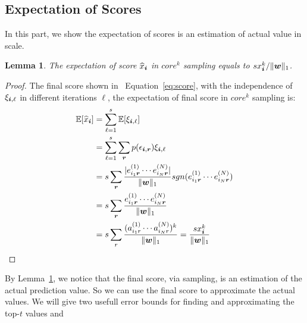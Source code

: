 \documentclass[letterpaper]{article}
\newcommand{\Sca}[3]{{#1}^{(#2)}_{i_#2#3}}%
\newcommand{\anr}[2]{\Sca{a}{#1}{#2}}
\newcommand{\enr}[2]{\Sca{e}{#1}{\V{#2}}}
\newcommand{\score}[1]{\xi_{\V{i},#1}}
\newcommand{\V}[1]{{\bm{{\MakeLowercase{#1}}}}}
\newcommand{\norm}[2]{\|#1\|_{#2}}
\newcommand{\Eqn}[1]   {Equation~\ref{eq:#1}}
\newcommand{\Lem}[1]  {Lemma~\ref{lem:#1}}
\newcommand{\predx}{\widehat{x}_{\V{i}}}
\newtheorem{lemma}{Lemma}
\begin{document}
\subsection{Expectation of Scores}
In this part, we show the expectation of scores is an estimation of actual value in scale.
\begin{lemma}\label{lem:Expectation}
The expectation of score $\widehat{x}_{\V{i}}$ in $core^k$ sampling equals to $sx^k_{\V{i}}/\norm{\V{w}}{1}$.
\end{lemma}
\begin{proof}
    The final score shown in ~\Eqn{score},
    with the independence of $\score{\ell}$ in different iterations $\ell$,
    the expectation of final score in  $core^k$ sampling is:
\begin{align*}
\mathbb{E}[\predx]
& = \sum_{\ell=1}^{s}\mathbb{E}[\score{\ell}]\\
& = \sum_{\ell=1}^{s}\sum_{\V{r}} p(\epsilon_{\V{i},\V{r}})\score{\ell} \\
& = s\sum_{\V{r}} \frac{|\enr{1}{r}\cdots\enr{N}{r}|}{\norm{\V{W}}{1}}
                  sgn(\enr{1}{r}\cdots\enr{N}{r})\\
& = s\sum_{\V{r}} \frac{\enr{1}{r}\cdots\enr{N}{r}}{\norm{\V{W}}{1}}\\
& = s\sum_{r}\frac{(\anr{1}{r}\cdots\anr{N}{r})^k}{\norm{\V{W}}{1}}
= \frac{sx^k_{\V{i}}}{\norm{\V{w}}{1}}
\end{align*}
\end{proof}
By \Lem{Expectation}, we notice that the final score, via sampling,
is an estimation of the actual prediction value.
So we can use the final score to approximate the actual values.
We will give two usefull error bounds for finding and approximating the top-$t$ values and
\end{document}
